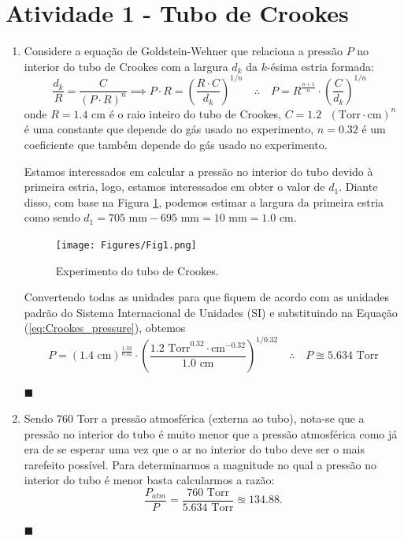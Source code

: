 \documentclass[12pt,a4paper]{article}
\begin{document}
\section*{Atividade 1 - Tubo de Crookes}
\begin{enumerate}

    \item Considere a equação de Goldstein-Wehner que relaciona a pressão $P$ no interior do tubo de Crookes com a largura $d_k$ da $k$-ésima estria formada:
    \begin{equation} \label{eq:Crookes_pressure}
        \frac{d_{k}}{R}=\frac{C}{\left(P\cdot R\right)^{n}}\implies P\cdot R=\left(\frac{R\cdot C}{d_{k}}\right)^{1/n}\quad\therefore\quad\boxed{P=R^{\frac{n+1}{n}}\cdot\left(\frac{C}{d_{k}}\right)^{1/n}}\text{ }
    \end{equation}
    onde $R=1.4$ cm é o raio inteiro do tubo de Crookes, $C=1.2\text{ }(\text{Torr}\cdot\text{cm})^n$ é uma constante que depende do gás usado no experimento, $n=0.32$ é um coeficiente que também depende do gás usado no experimento.
    
    Estamos interessados em calcular a pressão no interior do tubo devido à primeira estria, logo, estamos interessados em obter o valor de $d_1$. Diante disso, com base na Figura \ref{fig:ativ1}, podemos estimar a largura da primeira estria como sendo $d_1=705\text{ mm}-695\text{ mm}=10\text{ mm}=1.0\text{ cm}$.
    
    \begin{figure}[htp!]
        \centering
        \texttt{[image: Figures/Fig1.png]}
        \caption{Experimento do tubo de Crookes.}
        \label{fig:ativ1}
    \end{figure}
    
    Convertendo todas as unidades para que fiquem de acordo com as unidades padrão do Sistema Internacional de Unidades (SI) e substituindo na Equação (\ref{eq:Crookes_pressure}), obtemos
    \begin{equation} \label{eq:pressure}
        P=\left(1.4\text{ cm}\right)^{\frac{1.32}{0.32}}\cdot\left(\frac{1.2\text{ Torr}^{0.32}\cdot\text{cm}^{-0.32}}{1.0\text{ cm}}\right)^{1/0.32}\quad\therefore\quad\boxed{P\approxeq5.634\text{ Torr}}
    \end{equation}
    \begin{flushright}
        $\blacksquare$
    \end{flushright}



    \item Sendo $760$ Torr a pressão atmosférica (externa ao tubo), nota-se que a pressão no interior do tubo é muito menor que a pressão atmosférica como já era de se esperar uma vez que o ar no interior do tubo deve ser o mais rarefeito possível. Para determinarmos a magnitude no qual a pressão no interior do tubo é menor basta calcularmos a razão:  
    \begin{equation} \label{eq: Pressure_ratio}
        \frac{P_{atm}}{P}=\frac{760\text{ Torr}}{5.634\text{ Torr}}\approxeq 134.88.
    \end{equation}
    \begin{flushright}
        $\blacksquare$
    \end{flushright}


\end{enumerate}
\end{document}
